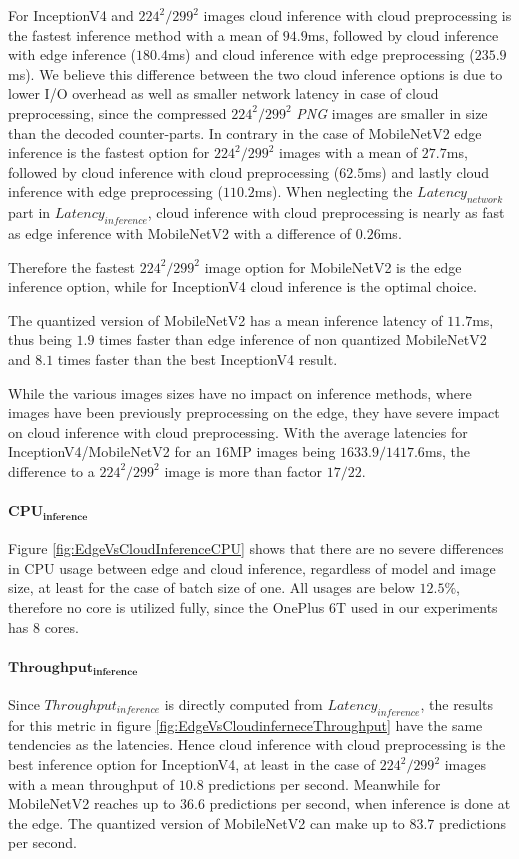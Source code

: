 For InceptionV4 and $224^2/299^2$ images cloud inference with cloud preprocessing is the fastest inference method with a mean of $94.9$ms, followed by cloud inference with edge inference ($180.4$ms) and cloud inference with edge preprocessing ($235.9$ms).
We believe this difference between the two cloud inference options is due to lower I/O overhead as well as smaller network latency in case of cloud preprocessing, since the compressed $224^2/299^2$ \emph{PNG} images are smaller in size than the decoded counter-parts. 
In contrary in the case of MobileNetV2 edge inference is the fastest option for $224^2/299^2$ images with a mean of $27.7$ms, followed by cloud inference with cloud preprocessing ($62.5$ms) and lastly cloud inference with edge preprocessing ($110.2$ms).
When neglecting the $Latency_{network}$ part in $Latency_{inference}$, cloud inference with cloud preprocessing is nearly as fast as edge inference with MobileNetV2 with a difference of $0.26$ms.

Therefore the fastest $224^2/299^2$ image option for MobileNetV2 is the edge inference option, while for InceptionV4 cloud inference is the optimal choice.

The quantized version of MobileNetV2 has a mean inference latency of $11.7$ms, thus being $1.9$ times faster than edge inference of non quantized MobileNetV2 and $8.1$ times faster than the best InceptionV4 result.

While the various images sizes have no impact on inference methods, where images have been previously preprocessing on the edge, they have severe impact on cloud inference with cloud preprocessing.
With the average latencies for InceptionV4/MobileNetV2 for an $16$MP images being $1633.9/1417.6$ms, the difference to a $224^2/299^2$ image is more than factor $17/22$.

\paragraph{$\mathbf{CPU_{inference}}$}
Figure \ref{fig:EdgeVsCloudInferenceCPU} shows that there are no severe differences in CPU usage between edge and cloud inference, regardless of model and image size, at least for the case of batch size of one.
All usages are below $12.5\%$, therefore no core is utilized fully, since the OnePlus 6T used in our experiments has $8$ cores.


\paragraph{$\mathbf{Throughput_{inference}}$}
Since $Throughput_{inference}$ is directly computed from $Latency_{inference}$, the results for this metric in figure \ref{fig:EdgeVsCloudinferneceThroughput} have the same tendencies as the latencies.
Hence cloud inference with cloud preprocessing is the best inference option for InceptionV4, at least in the case of $224^2/299^2$ images with a mean throughput of $10.8$ predictions per second.
Meanwhile for MobileNetV2 reaches up to $36.6$ predictions per second, when inference is done at the edge.
The quantized version of MobileNetV2 can make up to $83.7$ predictions per second.


